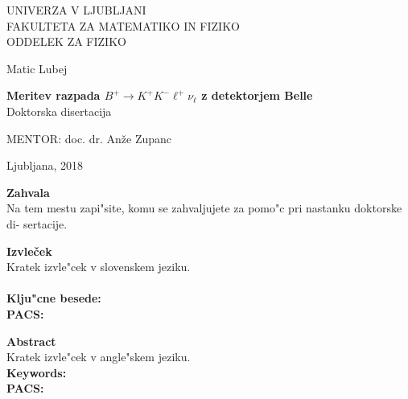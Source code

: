 \documentclass[longbibliography,a4paper,12pt]{book}
\begin{document}
\cleardoublepage
\begin{otherlanguage}{slovene}
\begin{center}


{\large UNIVERZA V LJUBLJANI\\
FAKULTETA ZA MATEMATIKO IN FIZIKO\\
ODDELEK ZA FIZIKO\\}

\vspace{4cm}

{\Large Matic Lubej\\}

\vspace{10mm}

{\bf \Large Meritev razpada $B^+ \to K^+K^-\ell^+\nu_\ell$ z detektorjem Belle\\}
\vspace{5mm}
{\large Doktorska disertacija}\\

\vfill

{\large MENTOR: doc. dr. An\v ze Zupanc\\
}


\vspace{2cm}

{\large Ljubljana, 2018}

\end{center}


\cleardoublepage
\mbox{}
\vfill
{\Large \bf Zahvala}
\vspace{1cm}\\
Na tem mestu zapi"site, komu se zahvaljujete za pomo"c 
pri nastanku doktorske di- sertacije.


\cleardoublepage
{\Large\bf Izvle\v cek}
\vspace{1cm}\\
Kratek izvle"cek v slovenskem jeziku.\\
\vspace{1cm}\\
{\bf Klju"cne besede:}\\
{\bf PACS:}
\end{otherlanguage}

\cleardoublepage
{\Large \bf Abstract}
\vspace{1cm}\\
Kratek izvle"cek v angle"skem jeziku.
\vspace{1cm}\\
{\bf Keywords:}\\
{\bf PACS:}
\end{document}
